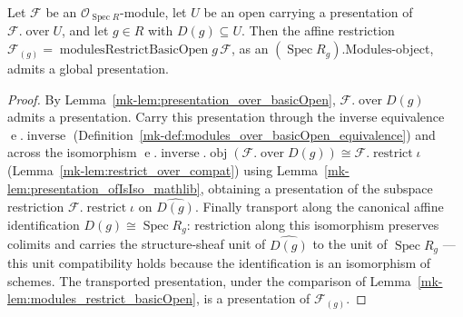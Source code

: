 \begin{lemma}
  \label{mk-lem:presentation_modulesRestrictBasicOpen}

  Let \(\mathcal{F}\) be an \(\mathcal{O}_{\operatorname{Spec} R}\)-module, let \(U\) be an open
  carrying a presentation of \(\mathcal{F}.\operatorname{over} U\), and let \(g \in R\) with
  \(D(g) \subseteq U\). Then the affine restriction \(\mathcal{F}_{(g)} =
  \operatorname{modulesRestrictBasicOpen} g\, \mathcal{F}\), as an
  \((\operatorname{Spec} R_g).\mathrm{Modules}\)-object, admits a global presentation.
\end{lemma}
\begin{proof}
  By Lemma~\ref{mk-lem:presentation_over_basicOpen}, \(\mathcal{F}.\operatorname{over} D(g)\)
  admits a presentation. Carry this presentation through the inverse equivalence
  \(\operatorname{e}.\operatorname{inverse}\) (Definition~\ref{mk-def:modules_over_basicOpen_equivalence})
  and across the isomorphism \(\operatorname{e}.\operatorname{inverse}.\operatorname{obj}
  (\mathcal{F}.\operatorname{over} D(g)) \cong \mathcal{F}.\operatorname{restrict} \iota\)
  (Lemma~\ref{mk-lem:restrict_over_compat}) using Lemma~\ref{mk-lem:presentation_ofIsIso_mathlib},
  obtaining a presentation of the subspace restriction \(\mathcal{F}.\operatorname{restrict} \iota\) on
  \(\widehat{D(g)}\). Finally transport along the canonical affine identification \(D(g) \cong
  \operatorname{Spec} R_g\): restriction along this isomorphism preserves colimits and
  carries the structure-sheaf unit of \(\widehat{D(g)}\) to the unit of \(\operatorname{Spec} R_g\)
  — this unit compatibility holds because the identification is an isomorphism of schemes.
  The transported presentation, under
  the comparison of Lemma~\ref{mk-lem:modules_restrict_basicOpen}, is a presentation of
  \(\mathcal{F}_{(g)}\).
\end{proof}

